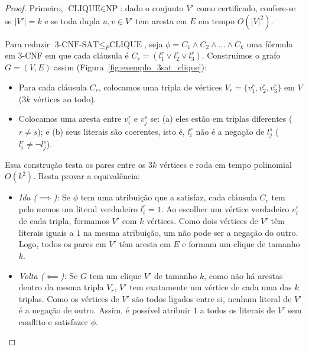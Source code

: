\documentclass[conference]{IEEEtran}
\theoremstyle{definition}
\theoremstyle{plain}
\begin{document}
\begin{proof}
Primeiro, $\text{CLIQUE} \in \text{NP}$: dado o conjunto $V'$ como certificado, confere-se se $|V'| = k$ e se toda dupla $u, v \in V'$ tem aresta em $E$ em tempo $O(|V|^2)$.

Para reduzir $\text{3-CNF-SAT} \le_P \text{CLIQUE}$, seja $\phi = C_1 \land C_2 \land \dots \land C_k$ uma fórmula em 3-CNF em que cada cláusula é $C_r = (l_1^r \lor l_2^r \lor l_3^r)$. Construímos o grafo $G = (V, E)$ assim (Figura~\ref{fig:exemplo_3sat_clique}):
\begin{itemize}
    \item Para cada cláusula $C_r$, colocamos uma tripla de vértices $V_r = \{v_1^r, v_2^r, v_3^r\}$ em $V$ ($3k$ vértices ao todo).
    \item Colocamos uma aresta entre $v_i^r$ e $v_j^s$ se: (a) eles estão em triplas diferentes ($r \neq s$); e (b) seus literais são coerentes, isto é, $l_i^r$ não é a negação de $l_j^s$ ($l_i^r \neq \neg l_j^s$).
\end{itemize}
Essa construção testa os pares entre os $3k$ vértices e roda em tempo polinomial $O(k^2)$. Resta provar a equivalência:
\begin{itemize}
    \item \textit{Ida ($\implies$):} Se $\phi$ tem uma atribuição que a satisfaz, cada cláusula $C_r$ tem pelo menos um literal verdadeiro $l_i^r = 1$. Ao escolher um vértice verdadeiro $v_i^r$ de cada tripla, formamos $V'$ com $k$ vértices. Como dois vértices de $V'$ têm literais iguais a $1$ na mesma atribuição, um não pode ser a negação do outro. Logo, todos os pares em $V'$ têm aresta em $E$ e formam um clique de tamanho $k$.
    \item \textit{Volta ($\impliedby$):} Se $G$ tem um clique $V'$ de tamanho $k$, como não há arestas dentro da mesma tripla $V_r$, $V'$ tem exatamente um vértice de cada uma das $k$ triplas. Como os vértices de $V'$ são todos ligados entre si, nenhum literal de $V'$ é a negação de outro. Assim, é possível atribuir $1$ a todos os literais de $V'$ sem conflito e satisfazer $\phi$.
\end{itemize}
\end{proof}
\end{document}

